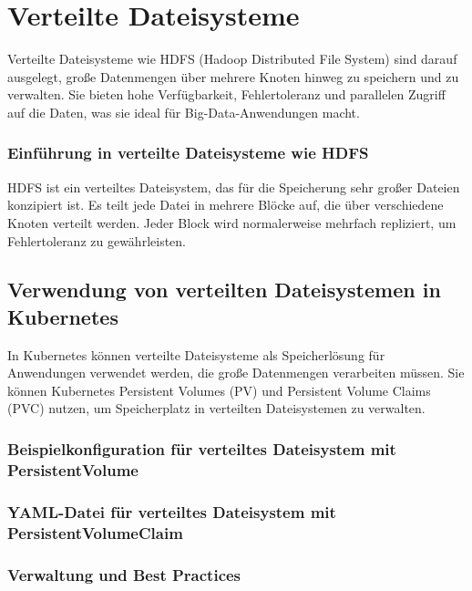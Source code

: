 \newpage

\section{Verteilte Dateisysteme}
\label{subsec:verteilte-dateisysteme}
Verteilte Dateisysteme wie HDFS (Hadoop Distributed File System) sind darauf ausgelegt, große Datenmengen über mehrere Knoten hinweg zu speichern und zu verwalten. Sie bieten hohe Verfügbarkeit, Fehlertoleranz und parallelen Zugriff auf die Daten, was sie ideal für Big-Data-Anwendungen macht.

\subsubsection{Einführung in verteilte Dateisysteme wie HDFS}
HDFS ist ein verteiltes Dateisystem, das für die Speicherung sehr großer Dateien konzipiert ist. Es teilt jede Datei in mehrere Blöcke auf, die über verschiedene Knoten verteilt werden. Jeder Block wird normalerweise mehrfach repliziert, um Fehlertoleranz zu gewährleisten.

\subsection{Verwendung von verteilten Dateisystemen in Kubernetes}
In Kubernetes können verteilte Dateisysteme als Speicherlösung für Anwendungen verwendet werden, die große Datenmengen verarbeiten müssen. Sie können Kubernetes Persistent Volumes (PV) und Persistent Volume Claims (PVC) nutzen, um Speicherplatz in verteilten Dateisystemen zu verwalten.

\subsubsection{Beispielkonfiguration für verteiltes Dateisystem mit PersistentVolume}


\subsubsection{YAML-Datei für verteiltes Dateisystem mit PersistentVolumeClaim}


\subsubsection{Verwaltung und Best Practices}

